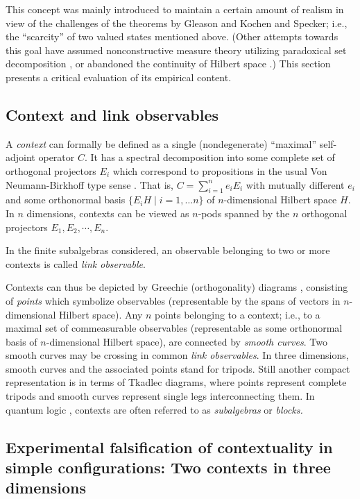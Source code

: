 \documentclass{aipproc}
\begin{document}
This concept was mainly introduced to maintain a certain amount of realism
in view of the challenges of the theorems by Gleason \cite{Gleason} and Kochen and Specker;
i.e., the ``scarcity'' of two valued states mentioned above.
(Other attempts towards this goal have assumed nonconstructive measure theory
utilizing paradoxical set decomposition
\cite{pitowsky-82,pitowsky-83},
or abandoned the continuity of Hilbert space \cite{meyer:99,havlicek-2000}.)
This section presents a critical evaluation of its empirical content.


\subsection{Context and link observables}


A {\em context} can formally be defined as a single (nondegenerate) ``maximal'' self-adjoint operator  ${ C}$.
It has a spectral
decomposition into some complete set of orthogonal projectors ${ E}_i$
which correspond to propositions in
the usual Von Neumann-Birkhoff type sense \cite{birkhoff-36,v-neumann-49}.
That is, ${ C}=\sum_{i=1}^n e_i { E}_i$
with mutually different $e_i$ and some orthonormal basis $\{{ E}_i{ H} \mid i=1,\ldots n\}$ of
$n$-dimensional Hilbert space ${ H}$.
In $n$ dimensions, contexts can be viewed as $n$-pods spanned by the $n$ orthogonal projectors
${ E}_1,
{ E}_2, \cdots,{ E}_n$.

In the finite subalgebras considered, an observable belonging to two or more contexts is called {\em link observable}.

Contexts can thus be depicted by Greechie (orthogonality) diagrams
\cite{greechie:71},  consisting of {\em points} which
symbolize observables (representable by the spans of vectors
in $n$-dimensional Hilbert space).
Any $n$ points belonging to a context; i.e., to a maximal set of commeasurable observables
(representable as some orthonormal basis of  $n$-dimensional Hilbert space),
are connected by {\em smooth curves}.
Two smooth curves may be crossing in  common {\em link observables}.
In three dimensions, smooth curves and the associated points stand for tripods.
Still another compact representation is in terms of Tkadlec diagrams,
where points represent complete tripods and smooth curves represent
single legs interconnecting them.
In quantum logic \cite{pulmannova-91,svozil-ql,kalmbach-83},
contexts are often referred to as {\em subalgebras} or {\em blocks.}


\subsection{Experimental falsification of contextuality in simple configurations: Two contexts in three dimensions}
\end{document}
